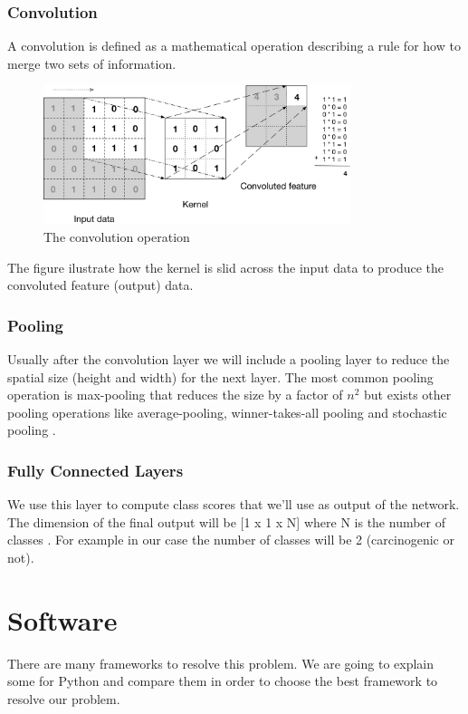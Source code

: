 \subsubsection[Convolution]{Convolution}

A convolution is defined as a mathematical operation describing a rule for how to merge two sets of information. \cite{starteddeeplearning}

\begin{figure}[H]
\centering
\includegraphics[width=0.8\textwidth]{./figures/convolution}
\caption{The convolution operation \cite{rajalingappaa}}
\end{figure}

The figure ilustrate how the kernel is slid across the input data to produce the convoluted feature (output) data. 

\subsubsection[Pooling]{Pooling}

Usually after the convolution layer we will include a pooling layer to reduce the spatial size \cite{starteddeeplearning} (height and width) for the next layer. The most common pooling operation is max-pooling that reduces the size by a factor of $n^2$ \cite{greenspan} but exists other pooling operations like average-pooling, winner-takes-all pooling \cite{advancesneuralinformation} and stochastic pooling \cite{stochastic}.

\subsubsection[Fully Connected Layers]{Fully Connected Layers}
We use this layer to compute class scores that we’ll use as output of the network. The dimension of the final output will be [1 x 1 x N] where N is the number of classes \cite{starteddeeplearning}. For example in our case the number of classes will be 2 (carcinogenic or  not).


\section{Software}
There are many frameworks to resolve this problem. We are going to explain some for Python and compare them in order to choose the best framework to resolve our problem. 


